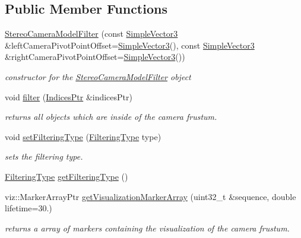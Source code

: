 \subsection*{\-Public \-Member \-Functions}
\begin{DoxyCompactItemize}
\item 
\hyperlink{classnext__best__view_1_1StereoCameraModelFilter_a9aab892f9b2aa95196071372b5bd31f4}{\-Stereo\-Camera\-Model\-Filter} (const \hyperlink{namespacenext__best__view_a59fc75b908e198bc02a9b19ba88edf12}{\-Simple\-Vector3} \&left\-Camera\-Pivot\-Point\-Offset=\hyperlink{namespacenext__best__view_a59fc75b908e198bc02a9b19ba88edf12}{\-Simple\-Vector3}(), const \hyperlink{namespacenext__best__view_a59fc75b908e198bc02a9b19ba88edf12}{\-Simple\-Vector3} \&right\-Camera\-Pivot\-Point\-Offset=\hyperlink{namespacenext__best__view_a59fc75b908e198bc02a9b19ba88edf12}{\-Simple\-Vector3}())
\begin{DoxyCompactList}\small\item\em constructor for the \hyperlink{classnext__best__view_1_1StereoCameraModelFilter}{\-Stereo\-Camera\-Model\-Filter} object \end{DoxyCompactList}\item 
void \hyperlink{classnext__best__view_1_1StereoCameraModelFilter_aff3d4b4ab7190c685d3f5d038875a998}{filter} (\hyperlink{namespacenext__best__view_a89edd5f370254b5c7689adfede9fe6a7}{\-Indices\-Ptr} \&indices\-Ptr)
\begin{DoxyCompactList}\small\item\em returns all objects which are inside of the camera frustum. \end{DoxyCompactList}\item 
void \hyperlink{classnext__best__view_1_1StereoCameraModelFilter_a446a3184aae602df1e4f2c28d2436ffb}{set\-Filtering\-Type} (\hyperlink{classnext__best__view_1_1StereoCameraModelFilter_a60feeec608139dd1bc248f43b7a0b9bc}{\-Filtering\-Type} type)
\begin{DoxyCompactList}\small\item\em sets the filtering type. \end{DoxyCompactList}\item 
\hyperlink{classnext__best__view_1_1StereoCameraModelFilter_a60feeec608139dd1bc248f43b7a0b9bc}{\-Filtering\-Type} \hyperlink{classnext__best__view_1_1StereoCameraModelFilter_abd99d9424fdffd297500bcd24aa23e2e}{get\-Filtering\-Type} ()
\item 
viz\-::\-Marker\-Array\-Ptr \hyperlink{classnext__best__view_1_1StereoCameraModelFilter_afdacd39e902f1fb1e1f5893d60849d11}{get\-Visualization\-Marker\-Array} (uint32\-\_\-t \&sequence, double lifetime=30.)
\begin{DoxyCompactList}\small\item\em returns a array of markers containing the visualization of the camera frustum. \end{DoxyCompactList}\end{DoxyCompactItemize}


